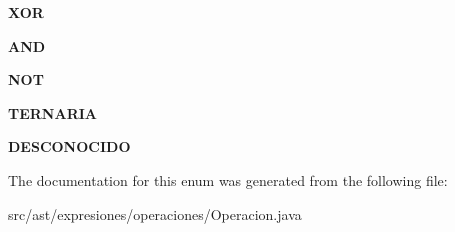 \begin{DoxyCompactItemize}
{\bfseries X\+OR}
\item 
\mbox{\label{enumast_1_1expresiones_1_1operaciones_1_1_operacion_1_1_operador_a7ddaa57c5b65acc4c96b97b1bc202653}} 
{\bfseries A\+ND}
\item 
\mbox{\label{enumast_1_1expresiones_1_1operaciones_1_1_operacion_1_1_operador_a485481620052829dbedd6cacfd1ca560}} 
{\bfseries N\+OT}
\item 
\mbox{\label{enumast_1_1expresiones_1_1operaciones_1_1_operacion_1_1_operador_a8cc87ba10520b3bc890b06ca3ccecd55}} 
{\bfseries T\+E\+R\+N\+A\+R\+IA}
\item 
\mbox{\label{enumast_1_1expresiones_1_1operaciones_1_1_operacion_1_1_operador_a2403ae17cfa347021d658cc975c08ca7}} 
{\bfseries D\+E\+S\+C\+O\+N\+O\+C\+I\+DO}
\end{DoxyCompactItemize}


The documentation for this enum was generated from the following file\+:\begin{DoxyCompactItemize}
\item 
src/ast/expresiones/operaciones/Operacion.\+java\end{DoxyCompactItemize}
